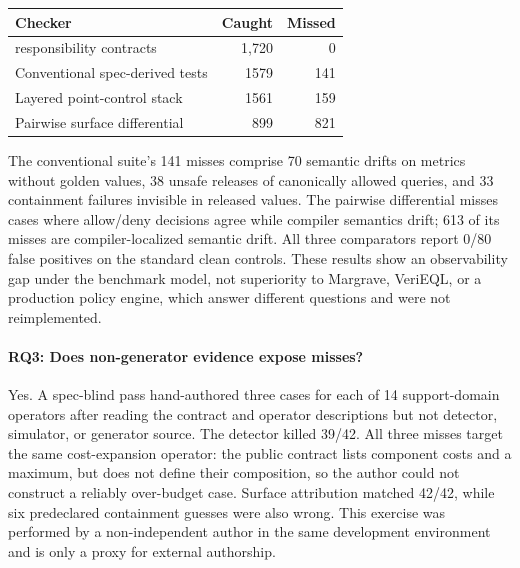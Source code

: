 \begin{center}
\small
\begin{tabular}{@{}L{0.58\columnwidth}rr@{}}
\toprule
Checker & Caught & Missed \\
\midrule
\policystrata{} responsibility contracts & 1,720 & 0 \\
Conventional spec-derived tests & 1579 & 141 \\
Layered point-control stack & 1561 & 159 \\
Pairwise surface differential & 899 & 821 \\
\bottomrule
\end{tabular}
\end{center}

The conventional suite's 141 misses comprise 70 semantic drifts on metrics without golden values, 38 unsafe releases of canonically allowed queries, and 33 containment failures invisible in released values. The pairwise differential misses cases where allow/deny decisions agree while compiler semantics drift; 613 of its misses are compiler-localized semantic drift. All three comparators report 0/80 false positives on the standard clean controls. These results show an observability gap under the benchmark model, not superiority to Margrave, VeriEQL, or a production policy engine, which answer different questions and were not reimplemented.

\paragraph{RQ3: Does non-generator evidence expose misses?}
Yes. A spec-blind pass hand-authored three cases for each of 14 support-domain operators after reading the contract and operator descriptions but not detector, simulator, or generator source. The detector killed 39/42. All three misses target the same cost-expansion operator: the public contract lists component costs and a maximum, but does not define their composition, so the author could not construct a reliably over-budget case. Surface attribution matched 42/42, while six predeclared containment guesses were also wrong. This exercise was performed by a non-independent author in the same development environment and is only a proxy for external authorship.

